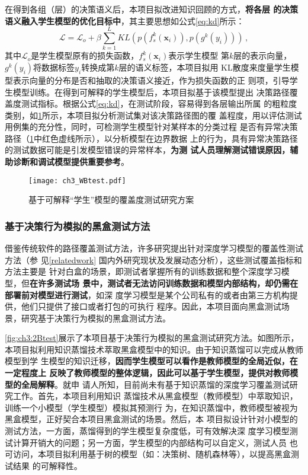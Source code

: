 在得到各组（层）的决策语义后，本项目拟改进知识回顾的方式，\textbf{将各层
的决策语义融入学生模型的优化目标中}，其主要思想如公式\eqref{eq:kd}所示：
\begin{equation}
    \mathcal{L} = \mathcal{L}_o + \beta\sum_{k=1}^L KL(p(f_s^k(\bm x_i)), p(g^k(y_i))) \,,
    \label{eq:kd}
\end{equation}
其中$\mathcal L_o$是学生模型原有的损失函数，$f_s^k(\bm x_i)$表示学生模型
第$k$层的表示向量，$g^k(y_i)$将数据标签$y_i$转换成第$k$层的语义标签，本项目拟用
KL散度来度量学生模型表示向量的分布是否和抽取的决策语义接近，作为损失函数的正
则项，引导学生模型训练。在得到可解释的学生模型后，本项目拟基于该模型提出
决策路径覆盖度测试指标。根据公式\eqref{eq:kd}，在测试阶段，容易得到各层输出所属
的粗粒度类别，{如\cref{fig:ch3:WBtest}所示，本项目拟分析测试集对该决策路径图的覆
盖程度，用以评估测试用例集的充分性，同时，可检测学生模型针对某样本的分类过程
是否有异常决策路径（\cref{fig:ch3:WBtest}中红色虚线所示），以分析模型在边界数据
上的行为}，具有异常决策路径的测试数据可能是引发模型错误的异常样本，\textbf{为测
试人员理解测试错误原因，辅助诊断和调试模型提供重要参考}。
\begin{figure}[htp]
    \begin{small}
        \begin{center}
            \texttt{[image: ch3\_WBtest.pdf]}
        \end{center}
        \caption{基于可解释``学生''模型的覆盖度测试研究方案}
        \label{fig:ch3:WBtest}
    \end{small}
\end{figure}

\subsubsection{基于决策行为模拟的黑盒测试方法}\label{ch3_1}

借鉴传统软件的路径覆盖测试方法，许多研究提出针对深度学习模型的覆盖性测试方法（参
见\ref{relatedwork} 国内外研究现状及发展动态分析），这些测试覆盖指标和方法主要是
针对白盒的场景，即测试者掌握所有的训练数据和整个深度学习模型，但\textbf{在许多测试场
景中，测试者无法访问训练数据和模型内部结构，却仍需在部署前对模型进行测试}，如深
度学习模型是某个公司私有的或者由第三方机构提供，他们只提供了接口或者打包的可执行
程序。因此，本项目面向黑盒测试场景，研究基于决策行为模拟的黑盒测试方法。

\cref{fig:ch3:2Btest}展示了本项目基于决策行为模拟的黑盒测试研究方法。如图所示，
本项目拟利用知识蒸馏技术萃取黑盒模型中的知识。由于知识蒸馏可以完成从教师模型到学
生模型的知识迁移，\textbf{因而学生模型可以看作是教师模型的全局近似，在一定程度上
反映了教师模型的整体逻辑，因此可以基于学生模型，提供对教师模型的全局解释}。就申
请人所知，目前尚未有基于知识蒸馏的深度学习覆盖测试研究工作。首先，本项目利用知识
蒸馏技术从黑盒模型（教师模型）中萃取知识，训练一个小模型（学生模型）模拟其预测行
为，在知识蒸馏中，教师模型被视为黑盒模型，正好契合本项目黑盒测试的场景。然后，本
项目拟设计针对小模型的测试方法，一方面，蒸馏得到的学生模型复杂度低，可有效解决深
度学习模型测试计算开销大的问题；另一方面，学生模型的内部结构可以自定义，测试人员
也可访问，本项目拟利用基于树的模型（如：决策树、随机森林等），以提高黑盒测试结果
的可解释性。

